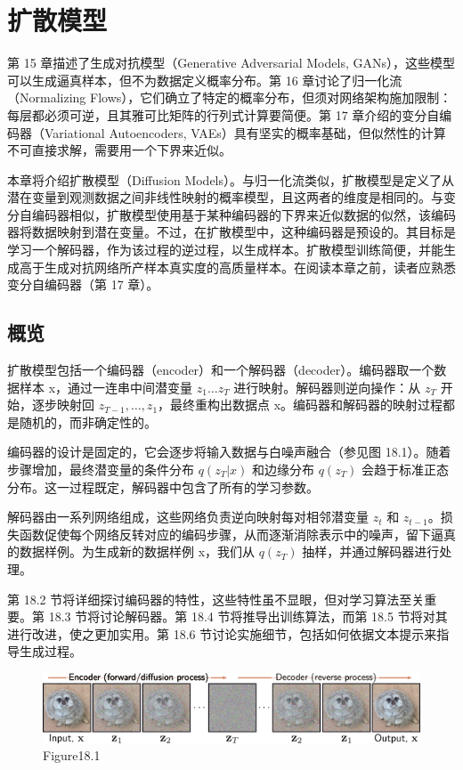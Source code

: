 \chapter{扩散模型}

第 15 章描述了生成对抗模型（Generative Adversarial Models, GANs），这些模型可以生成逼真样本，但不为数据定义概率分布。第 16 章讨论了归一化流（Normalizing Flows），它们确立了特定的概率分布，但须对网络架构施加限制：每层都必须可逆，且其雅可比矩阵的行列式计算要简便。第 17 章介绍的变分自编码器（Variational Autoencoders, VAEs）具有坚实的概率基础，但似然性的计算不可直接求解，需要用一个下界来近似。

本章将介绍扩散模型（Diffusion Models）。与归一化流类似，扩散模型是定义了从潜在变量到观测数据之间非线性映射的概率模型，且这两者的维度是相同的。与变分自编码器相似，扩散模型使用基于某种编码器的下界来近似数据的似然，该编码器将数据映射到潜在变量。不过，在扩散模型中，这种编码器是预设的。其目标是学习一个解码器，作为该过程的逆过程，以生成样本。扩散模型训练简便，并能生成高于生成对抗网络所产样本真实度的高质量样本。在阅读本章之前，读者应熟悉变分自编码器（第 17 章）。

\section{概览}
扩散模型包括一个编码器（encoder）和一个解码器（decoder）。编码器取一个数据样本 x，通过一连串中间潜变量 \(z_1 \ldots z_T\) 进行映射。解码器则逆向操作：从 \(z_T\) 开始，逐步映射回 \(z_{T-1}, \ldots, z_1\)，最终重构出数据点 x。编码器和解码器的映射过程都是随机的，而非确定性的。

编码器的设计是固定的，它会逐步将输入数据与白噪声融合（参见图 18.1）。随着步骤增加，最终潜变量的条件分布 \(q(z_T|x)\) 和边缘分布 \(q(z_T)\) 会趋于标准正态分布。这一过程既定，解码器中包含了所有的学习参数。

解码器由一系列网络组成，这些网络负责逆向映射每对相邻潜变量 \(z_t\) 和 \(z_{t-1}\)。损失函数促使每个网络反转对应的编码步骤，从而逐渐消除表示中的噪声，留下逼真的数据样例。为生成新的数据样例 x，我们从 \(q(z_T)\) 抽样，并通过解码器进行处理。

第 18.2 节将详细探讨编码器的特性，这些特性虽不显眼，但对学习算法至关重要。第 18.3 节将讨论解码器。第 18.4 节将推导出训练算法，而第 18.5 节将对其进行改进，使之更加实用。第 18.6 节讨论实施细节，包括如何依据文本提示来指导生成过程。

\begin{figure}[h!]
\centering
\includegraphics[width=0.7\linewidth]{png/chapter18/DiffusionOverview.png}
\caption{Figure18.1}
\end{figure}


